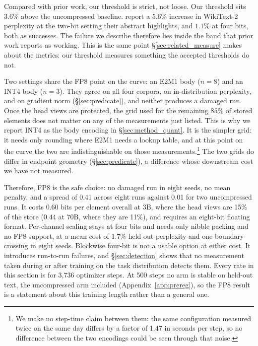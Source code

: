 \documentclass[11pt,letterpaper]{article}
\begin{document}
Compared with prior work, our threshold is strict, not loose. Our threshold sits $3.6\%$ above the uncompressed baseline. \citet{hyclora2025} report a $5.6\%$ increase in WikiText-2 perplexity at the two-bit setting their abstract highlights, and $1.1\%$ at four bits, both as successes. The failure we describe therefore lies inside the band that prior work reports as working. This is the same point \S\ref{sec:related_measure} makes about the metrics: our threshold measures something the accepted thresholds do not.

Two settings share the FP8 point on the curve: an E2M1 body ($n{=}8$) and an INT4 body ($n{=}3$). They agree on all four corpora, on in-distribution perplexity, and on gradient norm (\S\ref{sec:predicate}), and neither produces a damaged run. Once the head views are protected, the grid used for the remaining $85\%$ of stored elements does not matter on any of the measurements just listed. This is why we report INT4 as the body encoding in \S\ref{sec:method_quant}. It is the simpler grid: it needs only rounding where E2M1 needs a lookup table, and at this point on the curve the two are indistinguishable on those measurements.\footnote{We make no step-time claim between them: the same configuration measured twice on the same day differs by a factor of 1.47 in seconds per step, so no difference between the two encodings could be seen through that noise.} The two grids do differ in endpoint geometry (\S\ref{sec:predicate}), a difference whose downstream cost we have not measured.


Therefore, FP8 is the safe choice: no damaged run in eight seeds, no mean penalty, and a spread of 0.41 across eight runs against 0.01 for two uncompressed runs. It costs $0.60$ bits per element overall at 3B, where the head views are 15\% of the store ($0.44$ at 70B, where they are 11\%), and requires an eight-bit floating format. Per-channel scaling stays at four bits and needs only nibble packing and no FP8 support, at a mean cost of $1.7\%$ held-out perplexity and one boundary crossing in eight seeds. Blockwise four-bit is not a usable option at either cost. It introduces run-to-run failures, and \S\ref{sec:detection} shows that no measurement taken during or after training on the task distribution detects them. Every rate in this section is for 3{,}736 optimizer steps. At 500 steps no arm is stable on held-out text, the uncompressed arm included (Appendix~\ref{app:prereg}), so the FP8 result is a statement about this training length rather than a general one.
\end{document}
